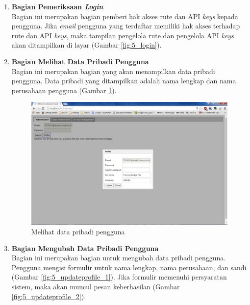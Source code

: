 \begin{enumerate}
	\item \textbf{Bagian Pemeriksaan \textit{Login}}\\
	Bagian ini merupakan bagian pemberi hak akses rute dan API \textit{keys} kepada pengguna. Jika \textit{email} pengguna yang terdaftar memiliki hak akses terhadap rute dan API \textit{keys}, maka tampilan pengelola rute dan pengelola API \textit{keys} akan ditampilkan di layar (Gambar \ref{fig:5_login}).
	
	\item \textbf{Bagian Melihat Data Pribadi Pengguna}\\
	Bagian ini merupakan bagian yang akan menampilkan data pribadi pengguna. Data pribadi yang ditampilkan adalah nama lengkap dan nama perusahaan pengguna (Gambar \ref{fig:5_getprofil}).

	\begin{figure}[htbp]
		\centering
			\includegraphics[scale=0.45]{Gambar/5_getprofil.png}
		\caption{Melihat data pribadi pengguna}
		\label{fig:5_getprofil}
	\end{figure}

	\item \textbf{Bagian Mengubah Data Pribadi Pengguna}\\
	Bagian ini merupakan bagian untuk mengubah data pribadi pengguna. Pengguna mengisi formulir untuk nama lengkap, nama perusahaan, dan sandi (Gambar \ref{fig:5_updateprofile_1}). Jika formulir memenuhi persyaratan sistem, maka akan muncul pesan keberhasilan (Gambar \ref{fig:5_updateprofile_2}).


\end{enumerate}

